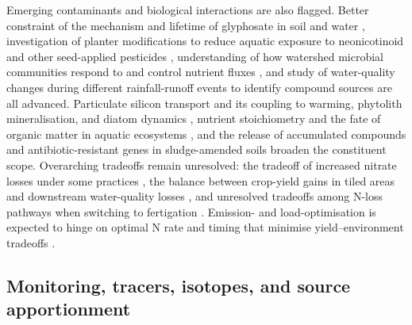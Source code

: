 \documentclass[11pt]{article}
\begin{document}
Emerging contaminants and biological interactions are also flagged. Better constraint of the mechanism and lifetime of glyphosate in soil and water \parencite{Spiese2023}, investigation of planter modifications to reduce aquatic exposure to neonicotinoid and other seed-applied pesticides \parencite{Schaafsma2019}, understanding of how watershed microbial communities respond to and control nutrient fluxes \parencite{Knorr2023}, and study of water-quality changes during different rainfall-runoff events to identify compound sources \parencite{Fraindová2022} are all advanced. Particulate silicon transport and its coupling to warming, phytolith mineralisation, and diatom dynamics \parencite{Sethna2022}, nutrient stoichiometry and the fate of organic matter in aquatic ecosystems \parencite{Manninen2023,Manninen2018}, and the release of accumulated compounds and antibiotic-resistant genes in sludge-amended soils \parencite{Ghirardini2019} broaden the constituent scope. Overarching tradeoffs remain unresolved: the tradeoff of increased nitrate losses under some practices \parencite{Derby2024}, the balance between crop-yield gains in tiled areas and downstream water-quality losses \parencite{Addab2022}, and unresolved tradeoffs among N-loss pathways when switching to fertigation \parencite{Gamble2018}. Emission- and load-optimisation is expected to hinge on optimal N rate and timing that minimise yield--environment tradeoffs \parencite{Emmett2022}.

\subsection{Monitoring, tracers, isotopes, and source apportionment}
\end{document}
